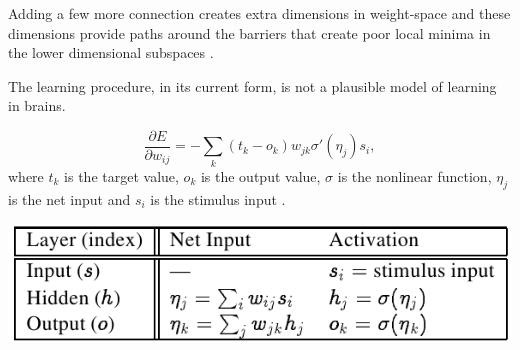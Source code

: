 Adding a few more connection creates extra dimensions in weight-space and these dimensions provide paths around the barriers that create poor local minima in the lower dimensional subspaces \citet{rumelhart1986learning}. 

The learning procedure, in its current form, is not a plausible model of learning in brains. 

$$\frac{\partial E}{\partial w_{ij}} = -\sum_k(t_k-o_k)w_{jk}\sigma'(\eta_j)s_i,$$
where $t_k$ is the target value, $o_k$ is the output value, $\sigma$ is the nonlinear function, $\eta_j$ is the net input and $s_i$ is the stimulus input \citet{o1996bio}.

\begin{center} 
\includegraphics{img/table_bp.png} 
\citet{farkas2013bal} 
\end{center} 
